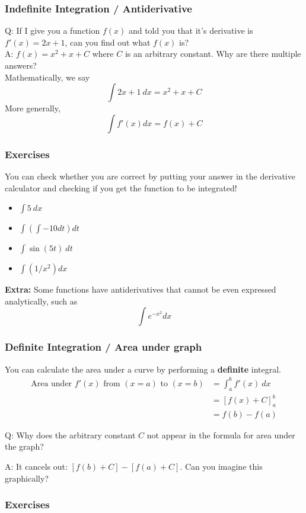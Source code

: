 \documentclass{article}
\begin{document}
\subsubsection{Indefinite Integration / Antiderivative}
Q: If I give you a function $f(x)$ and told you that it's derivative is $f'(x) = 2x + 1$, can you find out what $f(x)$ is? \\
A: $f(x) = x^2 + x + C$ where $C$ is an arbitrary constant. Why are there multiple answers?\\[10pt]
Mathematically, we say $$\int 2x + 1\ dx = x^2 + x + C$$
More generally, $$\int f'(x) dx = f(x) + C$$

\subsubsection{Exercises}
You can check whether you are correct by putting your answer in the derivative calculator and checking if you get the function to be integrated!
\begin{itemize}
    \item $\int 5\ dx$ 
    \item $\int \left( \int -10 dt \right) dt$
    \item $\int \sin(5t) \ dt$
    \item $\int (1/x^2) dx$
\end{itemize}


\textbf{Extra:} Some functions have antiderivatives that cannot be even expressed analytically, such as $$\int e^{-x^2} dx$$

\subsubsection{Definite Integration / Area under graph}
You can calculate the area under a curve by performing a \textbf{definite} integral.
\begin{align}
    \text{Area under }f'(x)\text{ from }(x=a)\text{ to }(x=b) &= \int_a^b f'(x)\ dx  \\
    &= \left[f(x) + C\right]^b_a \\
    &= f(b) - f(a)
\end{align}

Q: Why does the arbitrary constant $C$ not appear in the formula for area under the graph? 

A: It cancels out: $[f(b) + C] - [f(a) + C]$. Can you imagine this graphically? 

\subsubsection{Exercises}
\end{document}
